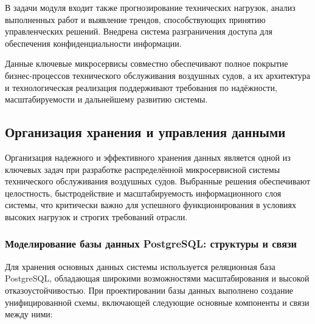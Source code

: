 \documentclass[14pt,a4paper]{extarticle}
\begin{document}
В задачи модуля входит также прогнозирование технических нагрузок, анализ выполненных работ и выявление трендов, способствующих принятию управленческих решений. Внедрена система разграничения доступа для обеспечения конфиденциальности информации.

Данные ключевые микросервисы совместно обеспечивают полное покрытие бизнес-процессов технического обслуживания воздушных судов, а их архитектура и технологическая реализация поддерживают требования по надёжности, масштабируемости и дальнейшему развитию системы.

\subsection{Организация хранения и управления данными}

Организация надежного и эффективного хранения данных является одной из ключевых задач при разработке распределённой микросервисной системы технического обслуживания воздушных судов. Выбранные решения обеспечивают целостность, быстродействие и масштабируемость информационного слоя системы, что критически важно для успешного функционирования в условиях высоких нагрузок и строгих требований отрасли.

\subsubsection{Моделирование базы данных PostgreSQL: структуры и связи}

Для хранения основных данных системы используется реляционная база PostgreSQL, обладающая широкими возможностями масштабирования и высокой отказоустойчивостью. При проектировании базы данных выполнено создание унифицированной схемы, включающей следующие основные компоненты и связи между ними:
\end{document}
